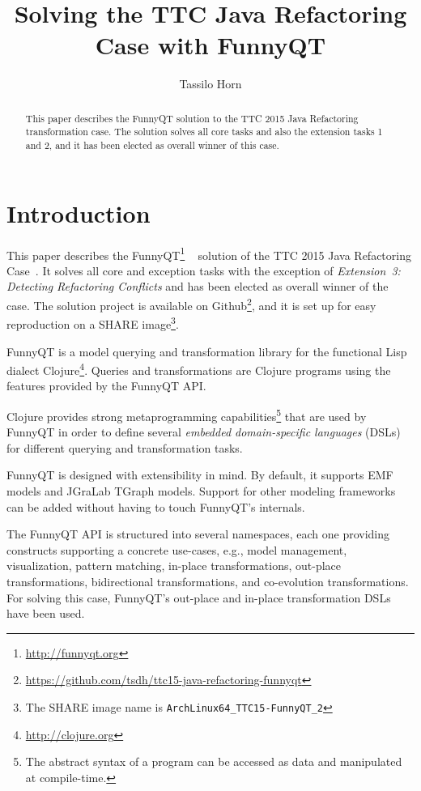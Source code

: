 \documentclass[submission]{eptcs}
\title{Solving the TTC Java Refactoring Case with FunnyQT}
\author{Tassilo Horn
  \institute{Institute for Software Technology, University Koblenz-Landau, Germany}
  \email{horn@uni-koblenz.de}}
\begin{document}
\maketitle

\begin{abstract}
  This paper describes the FunnyQT solution to the TTC 2015 Java Refactoring
  transformation case.  The solution solves all core tasks and also the
  extension tasks 1 and 2, and it has been elected as overall winner of this
  case.
\end{abstract}


\section{Introduction}
\label{sec:introduction}

This paper describes the FunnyQT\footnote{\url{http://funnyqt.org}}
~\cite{Horn2013MQWFQ,funnyqt-icgt15} solution of the TTC 2015 Java Refactoring
Case~\cite{java-refactoring-case-desc}.  It solves all core and exception tasks
with the exception of \emph{Extension~3: Detecting Refactoring Conflicts} and
has been elected as overall winner of the case.  The solution project is
available on
Github\footnote{\url{https://github.com/tsdh/ttc15-java-refactoring-funnyqt}},
and it is set up for easy reproduction on a SHARE image\footnote{The SHARE
  image name is \verb|ArchLinux64_TTC15-FunnyQT_2|}.

FunnyQT is a model querying and transformation library for the functional Lisp
dialect Clojure\footnote{\url{http://clojure.org}}.  Queries and
transformations are Clojure programs using the features provided by the FunnyQT
API.

Clojure provides strong metaprogramming capabilities\footnote{The abstract
  syntax of a program can be accessed as data and manipulated at compile-time.}
that are used by FunnyQT in order to define several \emph{embedded
  domain-specific languages} (DSLs) for different querying and transformation
tasks.

FunnyQT is designed with extensibility in mind.  By default, it supports EMF
models and JGraLab TGraph models.  Support for other modeling frameworks can be
added without having to touch FunnyQT's internals.

The FunnyQT API is structured into several namespaces, each one providing
constructs supporting a concrete use-cases, e.g., model management,
visualization, pattern matching, in-place transformations, out-place
transformations, bidirectional transformations, and co-evolution
transformations.  For solving this case, FunnyQT's out-place and in-place
transformation DSLs have been used.
\end{document}
